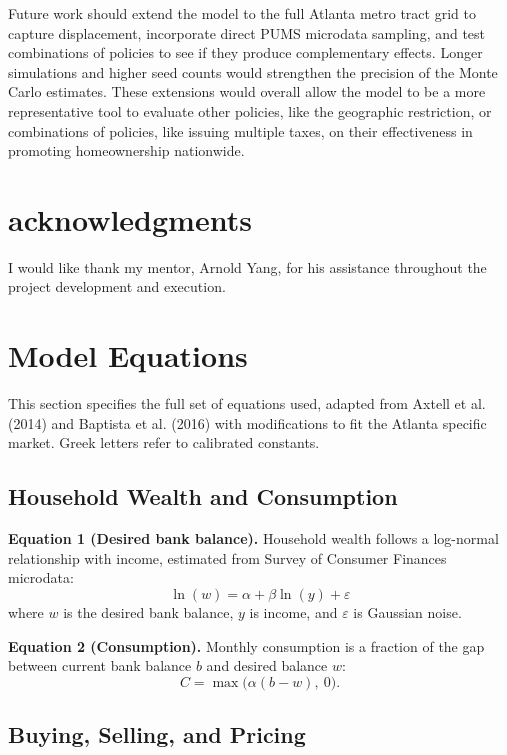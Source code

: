 \documentclass[twocolumn,showpacs,%
  nofootinbib,aps,superscriptaddress,%
  eqsecnum,prd,notitlepage,showkeys,10pt]{revtex4-1}
\begin{document}
Future work should extend the model to the full Atlanta metro tract grid to capture displacement, incorporate direct PUMS microdata sampling, and test combinations of policies to see if they produce complementary effects. Longer simulations and higher seed counts would strengthen the precision of the Monte Carlo estimates. These extensions would overall allow the model to be a more representative tool to evaluate other policies, like the geographic restriction, or combinations of policies, like issuing multiple taxes, on their effectiveness in promoting homeownership nationwide. 


\section*{acknowledgments}

I would like thank my mentor, Arnold Yang, for his assistance throughout the project development and execution.





\appendix
\section{Model Equations}
This section specifies the full set of equations used, adapted from Axtell et al. (2014) and Baptista et al. (2016) with modifications to fit the Atlanta specific market. Greek letters refer to calibrated constants. 



\subsection{Household Wealth and Consumption}
 
\textbf{Equation 1 (Desired bank balance).} Household wealth  follows a log-normal relationship with income, estimated from Survey of Consumer Finances microdata:
$$
\ln(w) = \alpha + \beta \ln(y) + \varepsilon
$$
where $w$ is the desired bank balance, $y$ is income, and $\varepsilon$ is Gaussian noise.
 
\textbf{Equation 2 (Consumption).} Monthly consumption is a fraction of the gap between current bank balance $b$ and desired balance $w$:
$$
C = \max\big(\alpha(b - w),\ 0\big).
$$
\subsection{Buying, Selling, and Pricing}
 
\end{document}
